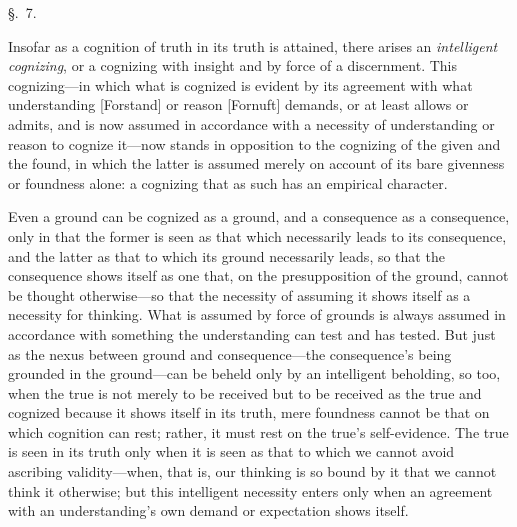 \documentclass[12pt,a4paper]{book}
\begin{document}
\begin{center}\large\S.~7.\end{center}
Insofar as a cognition of truth in its truth is attained, there arises an
\emph{intelligent cognizing}, or a cognizing with insight and by force of a
discernment. This cognizing---in which what is cognized is evident by its
agreement with what understanding [Forstand] or reason [Fornuft] demands, or at
least allows or admits, and is now assumed in accordance with a necessity of
understanding or reason to cognize it---now stands in opposition to the cognizing
of the given and the found, in which the latter is assumed merely on account of
its bare givenness or foundness alone: a cognizing that as such has an empirical
character.

Even a ground can be cognized as a ground, and a consequence as a consequence,
only in that the former is seen as that which necessarily leads to its
consequence, and the latter as that to which its ground necessarily leads, so
that the consequence shows itself as one that, on the presupposition of the
ground, cannot be thought otherwise---so that the necessity of assuming it shows
itself as a necessity for thinking. What is assumed by force of grounds is always
assumed in accordance with something the understanding can test and has tested.
But just as the nexus between ground and consequence---the consequence's being
grounded in the ground---can be beheld only by an intelligent beholding, so too,
when the true is not merely to be received but to be received as the true and
cognized because it shows itself in its truth, mere foundness cannot be that on
which cognition can rest; rather, it must rest on the true's self-evidence. The
true is seen in its truth only when it is seen as that to which we cannot avoid
ascribing validity---when, that is, our thinking is so bound by it that we cannot
think it otherwise; but this intelligent necessity enters only when an agreement
with an understanding's own demand or expectation shows itself.
\end{document}
